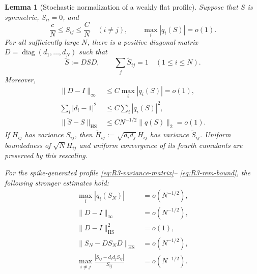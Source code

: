 \documentclass[11pt]{article}
\newtheorem{lemma}[theorem]{Lemma}
\theoremstyle{definition}
\theoremstyle{remark}
\newcommand{\diag}{\operatorname{diag}}
\newcommand{\HS}{\mathrm{HS}}
\newcommand{\norm}[1]{\lVert #1\rVert}
\begin{document}
\begin{lemma}[Stochastic normalization of a weakly flat profile]
\label{lem:R3-stochastic-normalization}
Suppose that \(S\) is symmetric, \(S_{ii}=0\), and
\[
 \frac{c}{N}\le S_{ij}\le\frac{C}{N}\quad(i\ne j),
 \qquad \max_i|q_i(S)|=o(1).
\]
For all sufficiently large \(N\), there is a positive diagonal matrix
\(D=\diag(d_1,\ldots,d_N)\) such that
\begin{equation}\label{eq:R3-balanced-profile}
 \widetilde S:=DSD,
 \qquad
 \sum_j\widetilde S_{ij}=1\quad(1\le i\le N).
\end{equation}
Moreover,
\begin{align}
 \norm{D-I}_{\infty}
 &\le C\max_i|q_i(S)|=o(1),\label{eq:R3-D-infty}\\
 \sum_i|d_i-1|^2
 &\le C\sum_i|q_i(S)|^2,\label{eq:R3-D-l2}\\
 \norm{\widetilde S-S}_{\HS}
 &\le C N^{-1/2}\norm{q(S)}_2=o(1).
 \label{eq:R3-balanced-HS}
\end{align}
If \(H_{ij}\) has variance \(S_{ij}\), then
\(\widetilde H_{ij}:=\sqrt{d_id_j}\,H_{ij}\) has variance
\(\widetilde S_{ij}\).  Uniform boundedness of \(\sqrt N H_{ij}\) and
uniform convergence of its fourth cumulants are preserved by this rescaling.

For the spike-generated profile \eqref{eq:R3-variance-matrix}--
\eqref{eq:R3-rem-bound}, the following stronger estimates hold:
\begin{align}
 \max_i|q_i(S_N)|&=o(N^{-1/2}),
 \label{eq:R3-strong-q}\\
 \norm{D-I}_\infty&=o(N^{-1/2}),
 \label{eq:R3-strong-D-infty}\\
 \norm{D-I}_{\HS}^2&=o(1),
 \label{eq:R3-strong-D-HS}\\
 \norm{S_N-DS_ND}_{\HS}&=o(N^{-1/2}),
 \label{eq:R3-strong-profile-HS}\\
 \max_{i\ne j}\frac{|S_{ij}-d_id_jS_{ij}|}{S_{ij}}
 &=o(N^{-1/2}).
 \label{eq:R3-strong-relative}
\end{align}
\end{lemma}
\end{document}
